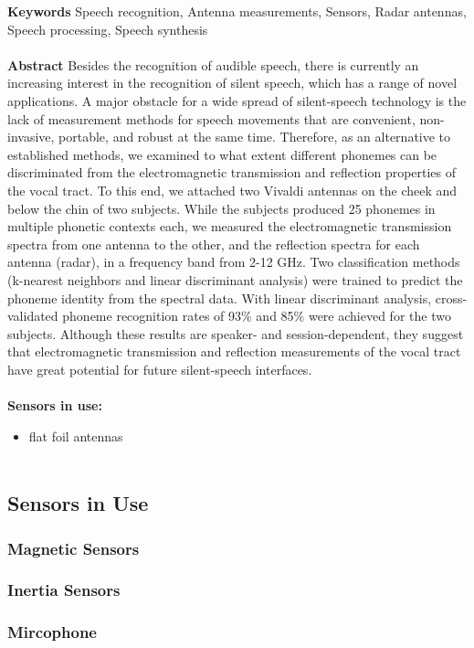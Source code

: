 \noindent
\textbf{Keywords} Speech recognition, Antenna measurements, Sensors, Radar antennas, Speech processing, Speech synthesis\\ \\

\noindent
\textbf{Abstract} Besides the recognition of audible speech, there is currently an increasing interest in the recognition of silent speech, which has a range of novel applications. A major obstacle for a wide spread of silent-speech technology is the lack of measurement methods for speech movements that are convenient, non-invasive, portable, and robust at the same time. Therefore, as an alternative to established methods, we examined to what extent different phonemes can be discriminated from the electromagnetic transmission and reflection properties of the vocal tract. To this end, we attached two Vivaldi antennas on the cheek and below the chin of two subjects. While the subjects produced 25 phonemes in multiple phonetic contexts each, we measured the electromagnetic transmission spectra from one antenna to the other, and the reflection spectra for each antenna (radar), in a frequency band from 2-12 GHz. Two classification methods (k-nearest neighbors and linear discriminant analysis) were trained to predict the phoneme identity from the spectral data. With linear discriminant analysis, cross-validated phoneme recognition rates of 93\% and 85\% were achieved for the two subjects. Although these results are speaker- and session-dependent, they suggest that electromagnetic transmission and reflection measurements of the vocal tract have great potential for future silent-speech interfaces.\\ \\

\noindent
\textbf{Sensors in use:}
\begin{itemize}
    \item flat foil antennas \\ \\
\end{itemize}


\subsection{Sensors in Use}
\subsubsection{Magnetic Sensors}
\subsubsection{Inertia Sensors}
\subsubsection{Mircophone}